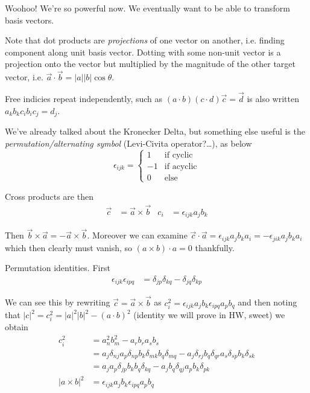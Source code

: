 \documentclass[10pt]{report}
\newcommand{\abs}[1]{\left|#1\right|}
\begin{document}
Woohoo! We're so powerful now. We eventually want to be able to transform basis vectors. 


Note that dot products are \emph{projections} of one vector on another, i.e. finding component along unit basis vector. Dotting with some non-unit vector is a projection onto the vector but multiplied by the magnitude of the other target vector, i.e. $\vec{a} \cdot\vec{b} = \abs{a}\abs{b}\cos\theta$.

Free indicies repeat independently, such as $(a\cdot b)(c \cdot d)\vec{c} = \vec{d}$ is also written $a_kb_kc_ib_ic_j = d_j$.

We've already talked about the Kronecker Delta, but something else useful is the \emph{permutation/alternating symbol} (Levi-Civita operator?\dots), as below
\begin{equation}
    \epsilon_{ijk} = 
    \begin{cases}
        1& \mbox{if } \text{cyclic}\\
        -1& \mbox{if } \text{acyclic}\\
        0& \mbox{else}
    \end{cases}
\end{equation}

Cross products are then
\begin{align}
    \vec{c} &= \vec{a} \times \vec{b}& c_i &= \epsilon_{ijk}a_j b_k
\end{align}

Then $\vec{b}\times \vec{a} = -\vec{a}\times\vec{b}$. Moreover we can examine $\vec{c}\cdot \vec{a} = \epsilon_{ijk}a_jb_ka_i = -\epsilon_{jik}a_jb_ka_i$ which then clearly must vanish, so $(a \times b) \cdot a = 0$ thankfully.

Permutation identities. First
\begin{align}
    \epsilon_{ijk}\epsilon_{ipq} &= \delta_{jp}\delta_{kq} - \delta_{jq}\delta_{kp}
\end{align}

We can see this by rewriting $\vec{c} = \vec{a} \times \vec{b}$ as $c_i^2 = \epsilon_{ijk}a_jb_k \epsilon_{ipq}a_pb_q$ and then noting that $\abs{c}^2 = c_i^2 = \abs{a}^2 \abs{b}^2 - (a\cdot b)^2$ (identity we will prove in HW, sweet) we obtain
\begin{align}
    c_i^2 &= a_n^2b_m^2 - a_rb_r a_sb_s\\
    &= a_j\delta_{nj}a_p\delta_{np}b_k\delta_{mk}b_q\delta_{mq} - a_j\delta_{rj}b_q\delta_{qr} a_s\delta_{sp}b_k\delta_{sk}\\
    &= a_ja_p\delta_{jp}b_kb_q\delta_{kq} - a_jb_q\delta_{qj} a_pb_k\delta_{pk}\\
    \abs{a \times b}^2 &= \epsilon_{ijk}a_jb_k \epsilon_{ipq}a_pb_q
\end{align}
\end{document}

